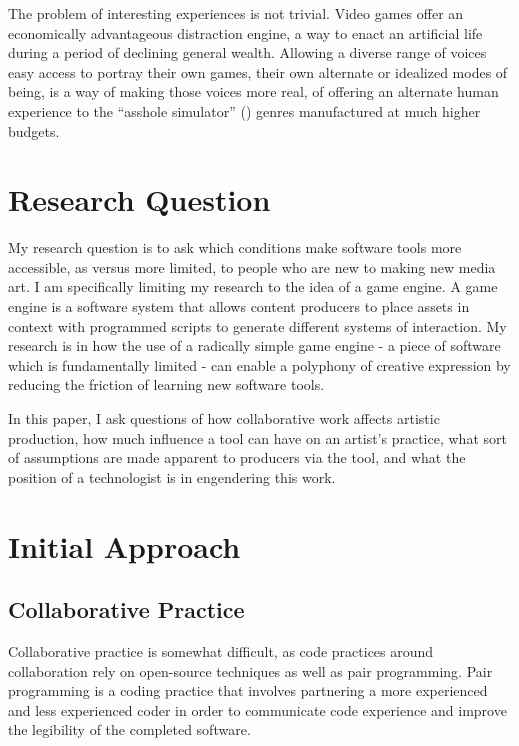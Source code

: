 The problem of interesting experiences is not trivial. Video games offer an economically advantageous distraction engine, a way to enact an artificial life during a period of declining general wealth. Allowing a diverse range of voices easy access to portray their own games, their own alternate or idealized modes of being, is a way of making those voices more real, of offering an alternate human experience to the “asshole simulator” (\cite{bissell}) genres manufactured at much higher budgets.


\section{Research Question}

My research question is to ask which conditions make software tools more accessible, as versus more limited, to people who are new to making new media art. I am specifically limiting my research to the idea of a game engine. A game engine is a software system that allows content producers to place assets in context with programmed scripts to generate different systems of interaction. My research is in how the use of a radically simple game engine - a piece of software which is fundamentally limited - can enable a polyphony of creative expression by reducing the friction of learning new software tools. 

In this paper, I ask questions of how collaborative work affects artistic production, how much influence a tool can have on an artist's practice, what sort of assumptions are made apparent to producers via the tool, and what the position of a technologist is in engendering this work.



\section{Initial Approach}


\subsection{Collaborative Practice}

Collaborative practice is somewhat difficult, as code practices around collaboration rely on open-source techniques as well as pair programming. Pair programming is a coding practice that involves partnering a more experienced and less experienced coder in order to communicate code experience and improve the legibility of the completed software.

